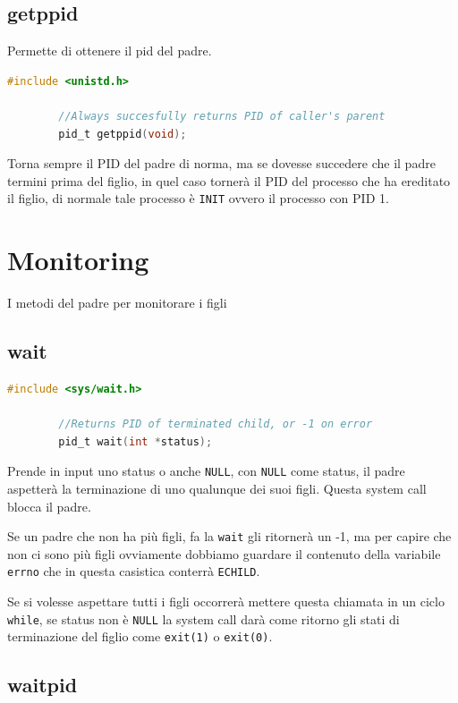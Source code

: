\documentclass[a4paper, 12pt]{book}
\begin{document}
    \subsection{getppid}

    Permette di ottenere il pid del padre.
    \begin{lstlisting}[language=C]
        #include <unistd.h>

        //Always succesfully returns PID of caller's parent 
        pid_t getppid(void);
    \end{lstlisting}
    Torna sempre il PID del padre di norma, ma se dovesse succedere 
    che il padre termini prima del figlio, in quel caso tornerà il PID del 
    processo che ha ereditato il figlio, di normale tale processo è \verb|INIT| 
    ovvero il processo con PID 1.

    \section{Monitoring}

    I metodi del padre per monitorare i figli 

    \subsection{wait}

    \begin{lstlisting}[language=C]
        #include <sys/wait.h>

        //Returns PID of terminated child, or -1 on error 
        pid_t wait(int *status);
    \end{lstlisting}
    Prende in input uno status o anche \verb|NULL|, con \verb|NULL| come 
    status, il padre aspetterà la terminazione di uno qualunque dei suoi 
    figli. Questa system call blocca il padre.

    Se un padre che non ha più figli, fa la \verb|wait| gli ritornerà 
    un -1, ma per capire che non ci sono più figli ovviamente 
    dobbiamo guardare il contenuto della variabile \verb|errno|
    che in questa casistica conterrà \verb|ECHILD|.

    Se si volesse aspettare tutti i figli occorrerà mettere questa 
    chiamata in un ciclo \verb|while|, se status non è \verb|NULL|
    la system call darà come ritorno gli stati di terminazione del figlio 
    come \verb|exit(1)| o \verb|exit(0)|.

    \subsection{waitpid}
\end{document}
